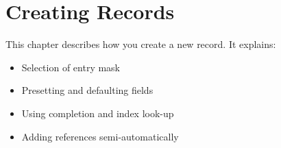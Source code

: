 
\chapter{Creating Records}
\label{cha:ucrea}

This chapter describes how you create a new record.
It explains:
\begin{itemize}
\item Selection of entry mask
\item Presetting and defaulting fields
\item Using completion and index look-up
\item Adding references semi-automatically
\end{itemize}










